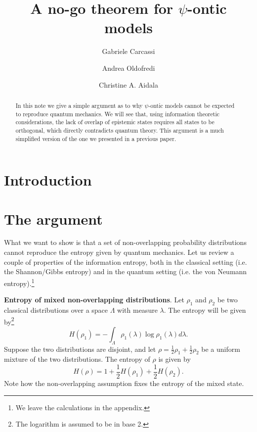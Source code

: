\documentclass[10pt,twocolumn, nofootinbib]{revtex4-2}
\begin{document}
\title{A no-go theorem for $\psi$-ontic models}
\author{Gabriele Carcassi}
\author{Andrea Oldofredi}
\author{Christine A. Aidala}

\date{}


\begin{abstract}
In this note we give a simple argument as to why $\psi$-ontic models cannot be expected to reproduce quantum mechanics. We will see that, using information theoretic considerations, the lack of overlap of epistemic states requires all states to be orthogonal, which directly contradicts quantum theory. This argument is a much simplified version of the one we presented in a previous paper.
\end{abstract}

\maketitle

\section{Introduction}


\section{The argument}

What we want to show is that a set of non-overlapping probability distributions cannot reproduce the entropy given by quantum mechanics. Let us review a couple of properties of the information entropy, both in the classical setting (i.e. the Shannon/Gibbs entropy) and in the quantum setting (i.e. the von Neumann entropy).\footnote{We leave the calculations in the appendix.}

\textbf{Entropy of mixed non-overlapping distributions}. Let $\rho_1$ and $\rho_2$ be two classical distributions over a space $\Lambda$ with measure $\lambda$. The entropy will be given by\footnote{The logarithm is assumed to be in base 2.}
\begin{equation}\label{shannon_entropy}
	H(\rho_1) = - \int_\Lambda \rho_1(\lambda) \log \rho_1(\lambda) d\lambda.
\end{equation}
Suppose the two distributions are disjoint, and let $\rho = \frac{1}{2} \rho_1 + \frac{1}{2} \rho_2$ be a uniform mixture of the two distributions. The entropy of $\rho$ is given by
\begin{equation}\label{entropy_nonoverlap}
	H(\rho) = 1 + \frac{1}{2} H(\rho_1) + \frac{1}{2} H(\rho_2).
\end{equation}
Note how the non-overlapping assumption fixes the entropy of the mixed state.
\end{document}
